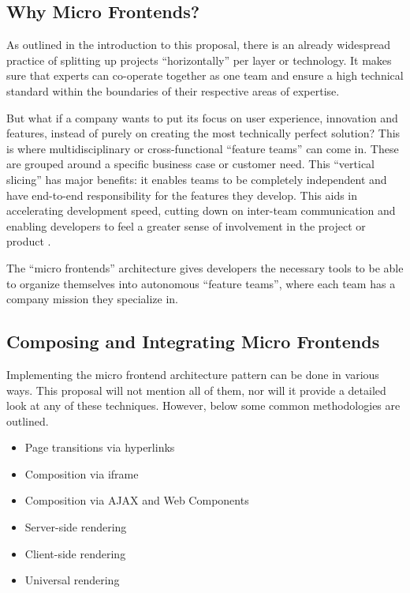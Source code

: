 \subsection{Why Micro Frontends?}
As outlined in the introduction to this proposal, there is an already widespread
practice of splitting up projects ``horizontally'' per layer or technology. It
makes sure that experts can co-operate together as one team and ensure a high
technical standard within the boundaries of their respective areas of expertise.

But what if a company wants to put its focus on user experience, innovation and
features, instead of purely on creating the most technically perfect solution?
This is where multidisciplinary or cross-functional ``feature teams'' can come
in. These are grouped around a specific business case or customer need. This
``vertical slicing'' has major benefits: it enables teams to be completely
independent and have end-to-end responsibility for the features they develop.
This aids in accelerating development speed, cutting down on inter-team
communication and enabling developers to feel a greater sense of involvement in
the project or product \autocite{LarmanVodde_2008}.

The ``micro frontends'' architecture gives developers the necessary tools to be
able to organize themselves into autonomous ``feature teams'', where each team
has a company mission they specialize in. \autocite{Geers_2020}

\subsection{Composing and Integrating Micro Frontends}
Implementing the micro frontend architecture pattern can be done in various
ways. This proposal will not mention all of them, nor will it provide a detailed
look at any of these techniques. However, below some common methodologies are
outlined. \autocite{Geers_2020} \autocite{Peltonen_etal_2020}
\autocite{Pavlenko_etal_2020}

\begin{itemize}
    \item Page transitions via hyperlinks
    \item Composition via iframe
    \item Composition via AJAX and Web Components
    \item Server-side rendering
    \item Client-side rendering
    \item Universal rendering
\end{itemize}

